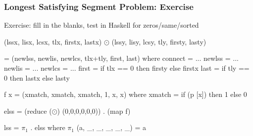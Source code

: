 \documentclass{beamer}
\renewcommand{\emph}[1]{\textcolor{structure}{#1}}
\newcommand{\emp}[1]{\textcolor{DikuRed}{ #1}}
\newcommand{\mymath}[1]{$ #1 $}
\newcommand{\myindx}[1]{_{#1}}
\begin{document}
\begin{frame}[fragile,t]
  \frametitle{Longest Satisfying Segment Problem: Exercise}

\begin{block}{Exercise: fill in the blanks, test in Haskell for zeros/same/sorted}
\begin{colorcode}
(lssx, lisx, lcsx, tlx, firstx, lastx) \mymath{\odot}
(lssy, lisy, lcsy, tly, firsty, lasty) 

  = (newlss, newlis, newlcs, tlx+tly, first, last)
     where
        connect = ...
        newlss  = ...
        newlis  = ... 
        newlcs  = ... 
        first   = if tlx == 0 then firsty else firstx
        last    = if tly == 0 then lastx  else lasty

f x = (xmatch, xmatch, xmatch, 1, x, x)
    where xmatch = if (p [x]) then 1 else 0

\emph{elss = (reduce (\mymath{\odot}) (0,0,0,0,0,0)) . (map f)}

\emp{lss  = \mymath{\pi\myindx{1}} . elss}
       where \mymath{\pi\myindx{1}} (a, _, _, _, _, _) = a         
\end{colorcode}
\end{block} 


\end{frame}



%
%
%
%
%
%
\end{document}
